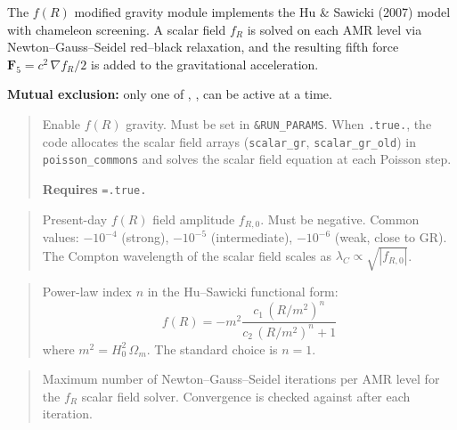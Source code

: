 The $f(R)$ modified gravity module implements the Hu \& Sawicki (2007)
model with chameleon screening.  A scalar field $f_R$ is solved on each
AMR level via Newton--Gauss--Seidel red--black relaxation, and the
resulting fifth force $\mathbf{F}_5 = c^2\,\nabla f_R / 2$ is added
to the gravitational acceleration.

\textbf{Mutual exclusion:} only one of ,
,  can be active at a time.

\label{param:use_fR}

\begin{quote}
Enable $f(R)$ gravity.  Must be set in \texttt{\&RUN\_PARAMS}.
When \texttt{.true.}, the code allocates the scalar field arrays
(\texttt{scalar\_gr}, \texttt{scalar\_gr\_old}) in
\texttt{poisson\_commons} and solves the scalar field equation at
each Poisson step.

\textbf{Requires} \texttt{=.true.}
\end{quote}

\label{param:fR0}

\begin{quote}
Present-day $f(R)$ field amplitude $f_{R,0}$.  Must be negative.
Common values: $-10^{-4}$ (strong), $-10^{-5}$ (intermediate),
$-10^{-6}$ (weak, close to GR).  The Compton wavelength of the
scalar field scales as $\lambda_C \propto \sqrt{|f_{R,0}|}$.
\end{quote}

\label{param:fR_n}

\begin{quote}
Power-law index $n$ in the Hu--Sawicki functional form:
\[
  f(R) = -m^2 \frac{c_1\,(R/m^2)^n}{c_2\,(R/m^2)^n + 1}
\]
where $m^2 = H_0^2\,\Omega_m$.  The standard choice is $n=1$.
\end{quote}

\label{param:n_iter_fR}

\begin{quote}
Maximum number of Newton--Gauss--Seidel iterations per AMR level for
the $f_R$ scalar field solver.  Convergence is checked against
 after each iteration.
\end{quote}

